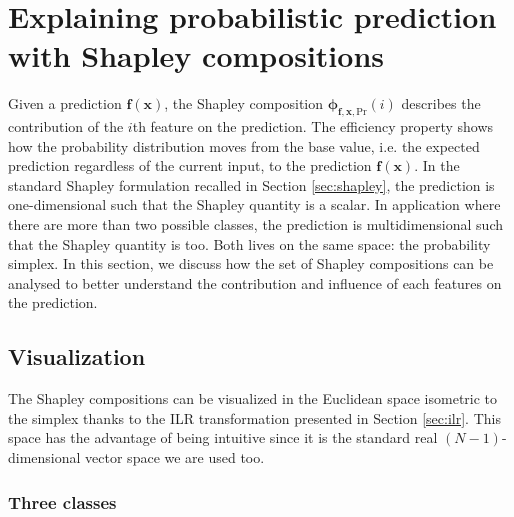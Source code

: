 \documentclass{article}
\theoremstyle{plain}
\theoremstyle{definition}
\theoremstyle{remark}
\begin{document}
\section{Explaining probabilistic prediction with Shapley compositions}
\label{sec:explain}


Given a prediction $\bm{f}(\bm{x})$, the Shapley composition $\bm{\phi}_{\bm{f},\bm{x},\text{Pr}}(i)$ describes the contribution of the $i$th feature on the prediction. The efficiency property shows how the probability distribution moves from the base value, i.e. the expected prediction regardless of the current input, to the prediction $\bm{f}(\bm{x})$. In the standard Shapley formulation recalled in Section \ref{sec:shapley}, the prediction is one-dimensional such that the Shapley quantity is a scalar. In application where there are more than two possible classes, the prediction is multidimensional such that the Shapley quantity is too. Both lives on the same space: the probability simplex. In this section, we discuss how the set of Shapley compositions can be analysed to better understand the contribution and influence of each features on the prediction.

\subsection{Visualization}

The Shapley compositions can be visualized in the Euclidean space isometric to the simplex thanks to the ILR transformation presented in Section \ref{sec:ilr}. This space has the advantage of being intuitive since it is the standard real $(N-1)$-dimensional vector space we are used too.

\subsubsection{Three classes}
\end{document}
